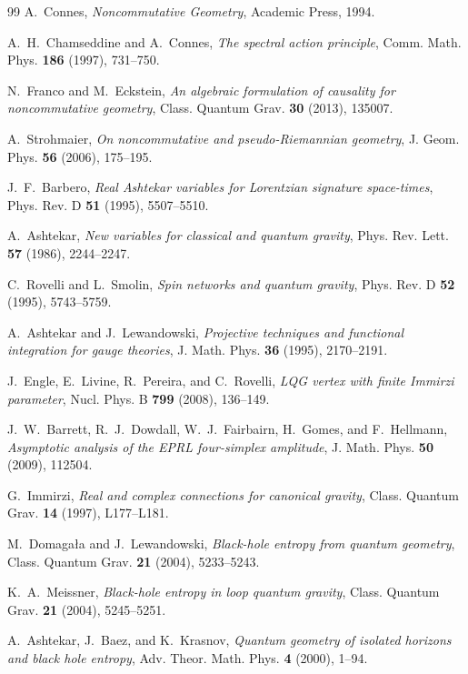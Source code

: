 \documentclass[11pt]{article}
\theoremstyle{definition}
\theoremstyle{remark}
\begin{document}
\begin{thebibliography}{99}
A.~Connes, \emph{Noncommutative Geometry}, Academic Press, 1994.

A.~H.~Chamseddine and A.~Connes, \emph{The spectral action principle},
Comm. Math. Phys. \textbf{186} (1997), 731--750.

N.~Franco and M.~Eckstein,
\emph{An algebraic formulation of causality for noncommutative geometry},
Class. Quantum Grav. \textbf{30} (2013), 135007.

A.~Strohmaier,
\emph{On noncommutative and pseudo-Riemannian geometry},
J. Geom. Phys. \textbf{56} (2006), 175--195.

J.~F.~Barbero, \emph{Real Ashtekar variables for Lorentzian signature
space-times}, Phys. Rev. D \textbf{51} (1995), 5507--5510.

A.~Ashtekar, \emph{New variables for classical and quantum gravity},
Phys. Rev. Lett. \textbf{57} (1986), 2244--2247.

C.~Rovelli and L.~Smolin, \emph{Spin networks and quantum gravity},
Phys. Rev. D \textbf{52} (1995), 5743--5759.

A.~Ashtekar and J.~Lewandowski,
\emph{Projective techniques and functional integration for gauge theories},
J. Math. Phys. \textbf{36} (1995), 2170--2191.

J.~Engle, E.~Livine, R.~Pereira, and C.~Rovelli,
\emph{LQG vertex with finite Immirzi parameter},
Nucl. Phys. B \textbf{799} (2008), 136--149.

J.~W.~Barrett, R.~J.~Dowdall, W.~J.~Fairbairn, H.~Gomes, and F.~Hellmann,
\emph{Asymptotic analysis of the EPRL four-simplex amplitude},
J. Math. Phys. \textbf{50} (2009), 112504.

G.~Immirzi, \emph{Real and complex connections for canonical gravity},
Class. Quantum Grav. \textbf{14} (1997), L177--L181.

M.~Domaga\l a and J.~Lewandowski,
\emph{Black-hole entropy from quantum geometry},
Class. Quantum Grav. \textbf{21} (2004), 5233--5243.

K.~A.~Meissner, \emph{Black-hole entropy in loop quantum gravity},
Class. Quantum Grav. \textbf{21} (2004), 5245--5251.

A.~Ashtekar, J.~Baez, and K.~Krasnov,
\emph{Quantum geometry of isolated horizons and black hole entropy},
Adv. Theor. Math. Phys. \textbf{4} (2000), 1--94.


\end{thebibliography}
\end{document}
